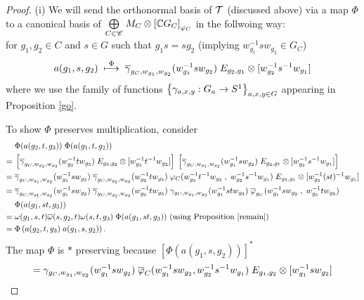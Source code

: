 \begin{proof}
(i) We will send the orthonormal basis of $ \mathcal T $ (discussed above) via a map $ \Phi $ to a canonical basis of $ \underset{C \in \mathscr C}{\bigoplus} \; M_C \otimes \left[\mathbb{C} G_C\right]_{\varphi_C}  $ in the follwoing way:\\
for $ g_1 , g_2 \in C $  and $ s\in G $ such that $ g_1 s = s g_2 $ (implying  $ w^{-1}_{g_1} s w_{g_2} \in G_C $)
\[
a(g_1 , s , g_2) \; \overset{\Phi}{\longmapsto} \; \overline{\gamma}_{g_C , w_{g_1} , w_{g_2}} (w^{-1}_{g_1} s w_{g_2}) \; E_{g_2,g_1} \otimes [w^{-1}_{g_2} s^{-1} w_{g_1}] 
\]
where we use the family of functions $\left\{ \gamma_{a,x,y}: G_a \rightarrow S^1  \right\}_{a,x,y\in G}$ appearing in Proposition \ref{go}.

To show $ \Phi $ preserves multiplication, consider
\begin{align*}
& \; \Phi (a(g_2,t,g_3)) \; \Phi (a(g_1,t,g_2))\\
= & \; \left[\overline{\gamma}_{g_C , w_{g_2} , w_{g_3}} (w^{-1}_{g_2} t w_{g_3}) \; E_{g_3,g_2} \otimes [w^{-1}_{g_3} t^{-1} w_{g_2}]\right] \; \left[\overline{\gamma}_{g_C , w_{g_1} , w_{g_2}} (w^{-1}_{g_1} s w_{g_2}) \; E_{g_2,g_1} \otimes [w^{-1}_{g_2} s^{-1} w_{g_1}]\right]\\
= & \; \overline{\gamma}_{g_C , w_{g_1} , w_{g_2}} (w^{-1}_{g_1} s w_{g_2}) \; \overline{\gamma}_{g_C , w_{g_2} , w_{g_3}} (w^{-1}_{g_2} t w_{g_3}) \; \varphi_C (w^{-1}_{g_3} t^{-1} w_{g_2} \; , \; w^{-1}_{g_2} s^{-1} w_{g_1} ) \; E_{g_3,g_1} \otimes [w^{-1}_{g_3} (st)^{-1} w_{g_1}]\\
= &  \; \overline{\gamma}_{g_C , w_{g_1} , w_{g_2}} (w^{-1}_{g_1} s w_{g_2}) \; \overline{\gamma}_{g_C , w_{g_2} , w_{g_3}} (w^{-1}_{g_2} t w_{g_3}) \;  \gamma_{g_C , w_{g_1} , w_{g_3}} (w^{-1}_{g_1} st w_{g_3}) \; \overline{\varphi}_{g_C} (w^{-1}_{g_1} s w_{g_2} \; , \; w^{-1}_{g_2} t w_{g_3} )\\
& \; \Phi (a(g_1 , st, g_3))\\
= & \; \omega (g_1 ,s , t) \overline{\omega} (s,g_2 , t) \omega (s , t, g_3) \; \Phi (a(g_1 , st, g_3)) \text{ (using Proposition \ref{remain})}\\
= & \; \Phi \left(a(g_2 , t, g_3) \; a(g_1 , s, g_2)\right).
\end{align*}
The map $ \Phi $ is $ * $ preserving because $ \left[ \Phi ( a(g_1,s,g_2) ) \right]^*
 $
\begin{align*}
= & \; \gamma_{g_C, w_{g_1} , w_{g_2} } (w^{-1}_{g_1} s w_{g_2}) \; \ol \vphi_C ( w^{-1}_{g_1} s w_{g_2} , w^{-1}_{g_2} s^{-1} w_{g_1} ) \; E_{g_1, g_2} \otimes [w^{-1}_{g_1} s w_{g_2}]\\

\end{align*}
\end{proof}

